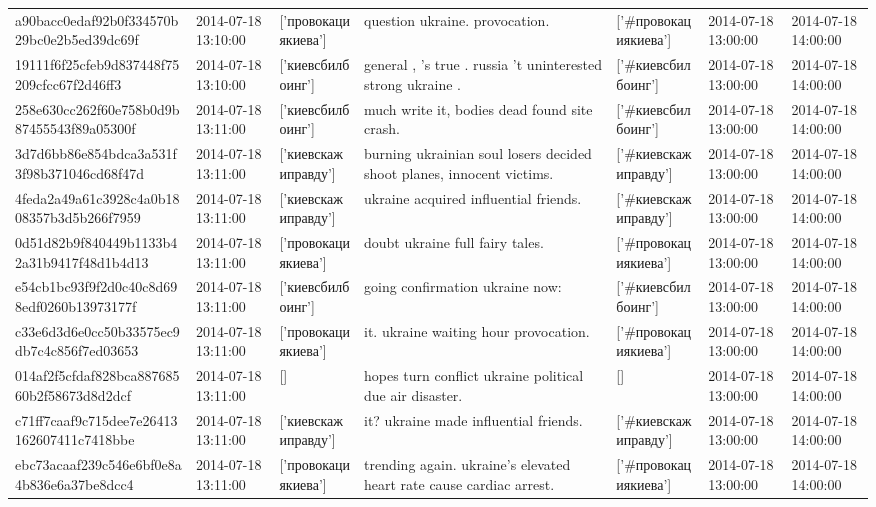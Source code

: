 \begin{tabular}{lllllll}
a90bacc0edaf92b0f334570b29bc0e2b5ed39dc69f & 2014-07-18 13:10:00 & ['провокациякиева'] & question ukraine. provocation. & ['#провокациякиева'] & 2014-07-18 13:00:00 & 2014-07-18 14:00:00 \\
19111f6f25cfeb9d837448f75209cfcc67f2d46ff3 & 2014-07-18 13:10:00 & ['киевсбилбоинг'] & general , 's true . russia 't uninterested strong ukraine . & ['#киевсбилбоинг'] & 2014-07-18 13:00:00 & 2014-07-18 14:00:00 \\
258e630cc262f60e758b0d9b87455543f89a05300f & 2014-07-18 13:11:00 & ['киевсбилбоинг'] & much write it, bodies dead found site crash. & ['#киевсбилбоинг'] & 2014-07-18 13:00:00 & 2014-07-18 14:00:00 \\
3d7d6bb86e854bdca3a531f3f98b371046cd68f47d & 2014-07-18 13:11:00 & ['киевскажиправду'] & burning ukrainian soul losers decided shoot planes, innocent victims. & ['#киевскажиправду'] & 2014-07-18 13:00:00 & 2014-07-18 14:00:00 \\
4feda2a49a61c3928c4a0b1808357b3d5b266f7959 & 2014-07-18 13:11:00 & ['киевскажиправду'] & ukraine acquired influential friends. & ['#киевскажиправду'] & 2014-07-18 13:00:00 & 2014-07-18 14:00:00 \\
0d51d82b9f840449b1133b42a31b9417f48d1b4d13 & 2014-07-18 13:11:00 & ['провокациякиева'] & doubt ukraine full fairy tales. & ['#провокациякиева'] & 2014-07-18 13:00:00 & 2014-07-18 14:00:00 \\
e54cb1bc93f9f2d0c40c8d698edf0260b13973177f & 2014-07-18 13:11:00 & ['киевсбилбоинг'] & going confirmation ukraine now: & ['#киевсбилбоинг'] & 2014-07-18 13:00:00 & 2014-07-18 14:00:00 \\
c33e6d3d6e0cc50b33575ec9db7c4c856f7ed03653 & 2014-07-18 13:11:00 & ['провокациякиева'] & it. ukraine waiting hour provocation. & ['#провокациякиева'] & 2014-07-18 13:00:00 & 2014-07-18 14:00:00 \\
014af2f5cfdaf828bca88768560b2f58673d8d2dcf & 2014-07-18 13:11:00 & [] & hopes turn conflict ukraine political due air disaster. & [] & 2014-07-18 13:00:00 & 2014-07-18 14:00:00 \\
c71ff7caaf9c715dee7e26413162607411c7418bbe & 2014-07-18 13:11:00 & ['киевскажиправду'] & it? ukraine made influential friends. & ['#киевскажиправду'] & 2014-07-18 13:00:00 & 2014-07-18 14:00:00 \\
ebc73acaaf239c546e6bf0e8a4b836e6a37be8dcc4 & 2014-07-18 13:11:00 & ['провокациякиева'] & trending again. ukraine's elevated heart rate cause cardiac arrest. & ['#провокациякиева'] & 2014-07-18 13:00:00 & 2014-07-18 14:00:00 \\

\end{tabular}
